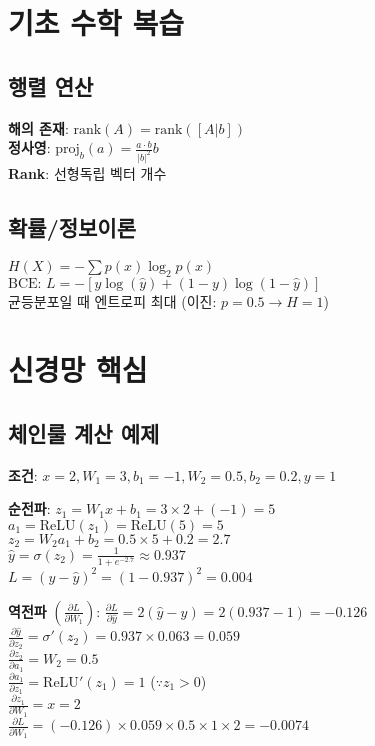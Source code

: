 \documentclass[6pt,landscape,a4paper]{article}
\begin{document}
\begin{multicols}{3}

\section{기초 수학 복습}

\subsection{행렬 연산}
\textbf{해의 존재}: $\text{rank}(A) = \text{rank}([A|b])$\\
\textbf{정사영}: $\text{proj}_b(a) = \frac{a \cdot b}{|b|^2}b$\\
\textbf{Rank}: 선형독립 벡터 개수
\subsection{확률/정보이론}
$H(X) = -\sum p(x) \log_2 p(x)$\\
$\text{BCE: } L = -[y \log(\hat{y}) + (1-y) \log(1-\hat{y})]$\\
균등분포일 때 엔트로피 최대 (이진: $p=0.5 \rightarrow H=1$)
\section{신경망 핵심}
\subsection{체인룰 계산 예제}
\textbf{조건}: $x=2, W_1=3, b_1=-1, W_2=0.5, b_2=0.2, y=1$

\textbf{순전파}:
$z_1 = W_1 x + b_1 = 3 \times 2 + (-1) = 5$\\
$a_1 = \text{ReLU}(z_1) = \text{ReLU}(5) = 5$\\
$z_2 = W_2 a_1 + b_2 = 0.5 \times 5 + 0.2 = 2.7$\\
$\hat{y} = \sigma(z_2) = \frac{1}{1+e^{-2.7}} \approx 0.937$\\
$L = (y-\hat{y})^2 = (1-0.937)^2 = 0.004$

\textbf{역전파} $(\frac{\partial L}{\partial W_1})$:
$\frac{\partial L}{\partial \hat{y}} = 2(\hat{y}-y) = 2(0.937-1) = -0.126$\\
$\frac{\partial \hat{y}}{\partial z_2} = \sigma'(z_2) = 0.937 \times 0.063 = 0.059$\\
$\frac{\partial z_2}{\partial a_1} = W_2 = 0.5$\\
$\frac{\partial a_1}{\partial z_1} = \text{ReLU}'(z_1) = 1$ ($\because z_1 > 0$)\\
$\frac{\partial z_1}{\partial W_1} = x = 2$\\
$\frac{\partial L}{\partial W_1} = (-0.126) \times 0.059 \times 0.5 \times 1 \times 2 = -0.0074$


\end{multicols}
\end{document}
